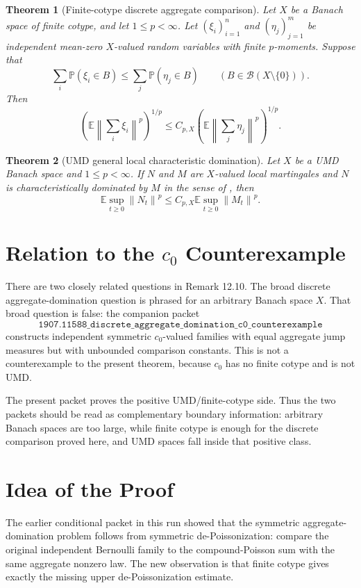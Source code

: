 \documentclass[11pt]{article}
\newtheorem{theorem}{Theorem}
\newcommand{\E}{\mathbb E}
\newcommand{\Pp}{\mathbb P}
\newcommand{\norm}[1]{\left\lVert #1\right\rVert}
\newcommand{\1}{\mathbf 1}
\begin{document}
\begin{theorem}[Finite-cotype discrete aggregate comparison]
\label{thm:discrete}
Let \(X\) be a Banach space of finite cotype, and let \(1\le p<\infty\).
Let \((\xi_i)_{i=1}^n\) and \((\eta_j)_{j=1}^m\) be independent mean-zero
\(X\)-valued random variables with finite \(p\)-moments.  Suppose that
\[
  \sum_i \Pp(\xi_i\in B)
  \le
  \sum_j \Pp(\eta_j\in B)
  \qquad (B\in\mathcal B(X\setminus\{0\})).
\]
Then
\[
  \left(\E\norm{\sum_i\xi_i}^p\right)^{1/p}
  \le
  C_{p,X}
  \left(\E\norm{\sum_j\eta_j}^p\right)^{1/p}.
\]
\end{theorem}

\begin{theorem}[UMD general local characteristic domination]
\label{thm:umd}
Let \(X\) be a UMD Banach space and \(1\le p<\infty\).  If \(N\) and \(M\)
are \(X\)-valued local martingales and \(N\) is characteristically dominated
by \(M\) in the sense of \cite[Definition 12.9]{Yaroslavtsev2019}, then
\[
  \E\sup_{t\ge0}\norm{N_t}^p
  \le
  C_{p,X}
  \E\sup_{t\ge0}\norm{M_t}^p.
\]
\end{theorem}

\section*{Relation to the \(c_0\) Counterexample}

There are two closely related questions in Remark 12.10.  The broad discrete
aggregate-domination question is phrased for an arbitrary Banach space \(X\).
That broad question is false: the companion packet
\[
\texttt{1907.11588\_discrete\_aggregate\_domination\_c0\_counterexample}
\]
constructs independent symmetric \(c_0\)-valued families with equal aggregate
jump measures but with unbounded comparison constants.  This is not a
counterexample to the present theorem, because \(c_0\) has no finite cotype and
is not UMD.

The present packet proves the positive UMD/finite-cotype side.  Thus the two
packets should be read as complementary boundary information: arbitrary Banach
spaces are too large, while finite cotype is enough for the discrete comparison
proved here, and UMD spaces fall inside that positive class.

\section*{Idea of the Proof}

The earlier conditional packet in this run showed that the symmetric
aggregate-domination problem follows from symmetric de-Poissonization: compare
the original independent Bernoulli family to the compound-Poisson sum with the
same aggregate nonzero law.  The new observation is that finite cotype gives
exactly the missing upper de-Poissonization estimate.
\end{document}
